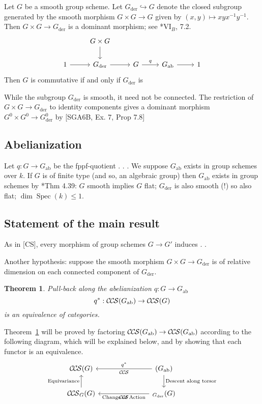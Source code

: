 \documentclass[10pt]{amsart}
\theoremstyle{plain}
\newtheorem{theorem}{Theorem}[section]
\theoremstyle{definition}
\newcommand{\Fq}{k}
\newcommand{\Spec}[1]{{\operatorname{Spec}(#1)}}
\newcommand{\der}{_{\operatorname{der}}}
\newcommand{\ab}{_{\operatorname{ab}}}
\newcommand{\CCS}{{\mathcal{C\hskip-.8pt C\hskip-0.8pt S}}}
\begin{document}
Let $G$ be a smooth group scheme.
Let $G\der \hookrightarrow G$ denote the closed subgroup generated by the smooth morphism $G\times G \to G$ given by $(x,y)\mapsto xyx^{-1}y^{-1}$. Then $G \times G \to G\der$ is a dominant morphism; see \cite{SGA3}*{{VI}$_B$, 7.2}.
\[
\begin{tikzcd}
{} & G\times G \arrow{d}{} &&&\\
1 \arrow{r} & G\der \arrow{r}{} & G \arrow{r}{q} & G\ab \arrow{r} & 1
\end{tikzcd}
\]
Then $G$ is commutative if and only if $G\der$ is

While the subgroup $G\der$ is smooth, it need not be connected. The restriction of $G\times G\to G\der$ to identity components gives a dominant morphism $G^0\times G^0 \to G^0\der$ by [SGA6B, Ex. 7, Prop 7.8]

\subsection{Abelianization}

Let $q: G \to G\ab$ be the fppf-quotient  . . . 
We suppose $G\ab$ exists in group schemes over $\Fq$. 
If $G$ is of finite type (and so, an algebraic group) then $G\ab$ exists in group schemes by \cite{GM}*{Thm 4.39}: $G$ smooth implies $G$ flat; $G\der$ is also smooth (!) so also flat; $\dim \Spec{\Fq} \leq 1$.
 
 \subsection{Statement of the main result}


As in [CS], every morphism of group schemes $G \to G'$ induces . .  
 
Another hypothesis: suppose the smooth morphism $G\times G\to G\der$ is of relative dimension on each connected component of $G\der$.

\begin{theorem}\label{thm:Gab}
Pull-back along the abelianization $q : G \to G\ab$
\[
q^* : \CCS(G\ab) \to \CCS(G)
\]
is an equivalence of categories.
\end{theorem}


Theorem~\ref{thm:Gab} will be proved by factoring $\CCS(G\ab) \to \CCS(G\ab)$ according to the following diagram, which will be explained below, 
and by showing that each functor is an equivalence.
\[
\begin{tikzcd}
 \CCS(G)  &&& \arrow{lll}[swap]{q^*}  \CCS(G\ab) \arrow{d}{\text{Descent along torsor}} \\
\CCS_G(G)  \arrow{u}{\text{Equivariance}} &&& \arrow{lll}{\text{Change of Action}} \CCS_{G\der}(G) 
\end{tikzcd}
\]
\end{document}
